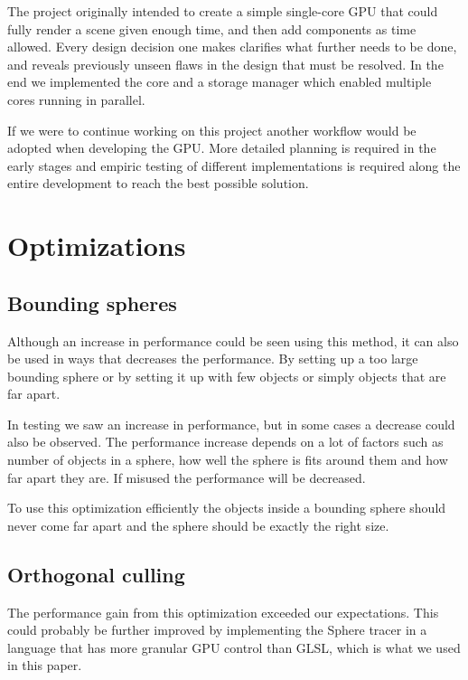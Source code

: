 			The project originally intended to create a simple single-core GPU
			that could fully render a scene given enough time, and then add	
			components as time allowed. Every design decision one makes 
			clarifies what further needs to be done, and reveals previously 
			unseen flaws in the design that must
			be resolved. In the end we implemented the core and a storage 
			manager which enabled multiple cores running in parallel.

			If we were to continue working on this project another workflow
			would be adopted when developing the GPU. More detailed planning is
			required in the early stages and empiric testing of different
			implementations is required along the entire development to reach
			the best possible solution.

	\section{Optimizations} \label{optimization}

		\subsection{Bounding spheres}

			Although an increase in performance could be seen using this
			method, it can also be used in ways that decreases the performance.
			By setting up a too large bounding sphere or by setting it up with
			few objects or simply objects that are far apart.

			In testing we saw an increase in performance, but in some cases a
			decrease could also be observed. The performance increase depends
			on a lot of factors such as number of objects in a sphere, how well
			the sphere is fits around them and how far apart they are. If
			misused the performance will be decreased.

			To use this optimization efficiently the objects inside a bounding
			sphere should never come far apart and the sphere should be exactly
			the right size.

		\subsection{Orthogonal culling}

			The performance gain from this optimization exceeded our 
			expectations. This could probably be further improved by 
			implementing the Sphere tracer in a language that has more granular 
			GPU control than GLSL, which is what we used in this paper.

